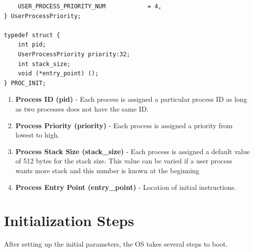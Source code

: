 \documentclass[12pt]{report}
\begin{document}
\begin{enumerate}
\begin{lstlisting}
    USER_PROCESS_PRIORITY_NUM            = 4,
} UserProcessPriority;

typedef struct {
    int pid;
    UserProcessPriority priority:32;
    int stack_size;
    void (*entry_point) ();
} PROC_INIT;
\end{lstlisting}
        \begin{enumerate}
            \item { \bf Process ID (pid) }- Each process is assigned a particular process ID as long as two processes does not have the same ID.
            \item { \bf Process Priority (priority) }- Each process is assigned a priority from lowest to high.
            \item { \bf Process Stack Size (stack\_size) }- Each process is assigned a default value of 512 bytes for the stack size. This value can be varied if a user process wants more stack and this number is known at the beginning
            \item { \bf Process Entry Point (entry\_point) }- Location of initial instructions.
        \end{enumerate}
\end{enumerate}

\section{Initialization Steps}
After setting up the initial parameters, the OS takes several steps to boot.
\end{document}
